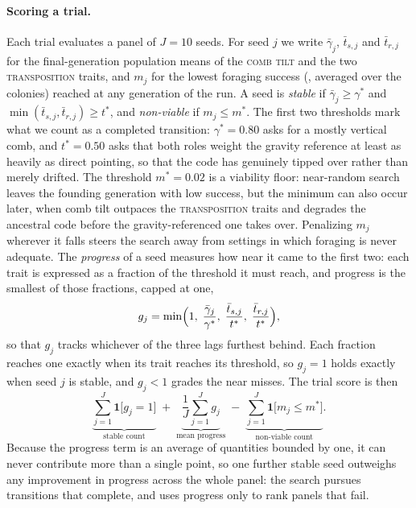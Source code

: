\documentclass[11pt]{article}
\newcommand{\trait}[1]{\textsc{#1}}
\begin{document}
\paragraph{Scoring a trial.}
Each trial evaluates a panel of $J = 10$ seeds. For seed $j$ we
write $\bar\gamma_j$, $\bar t_{s,j}$ and $\bar t_{r,j}$ for the final-generation
population means of the \trait{comb tilt} and the two \trait{transposition}
traits, and $m_j$ for the lowest foraging success (, averaged
over the colonies) reached at any generation of the run. A seed is \emph{stable} if $\bar\gamma_j \ge
\gamma^\ast$ and $\min(\bar t_{s,j}, \bar t_{r,j}) \ge t^\ast$, and
\emph{non-viable} if $m_j \le m^\ast$. The first two thresholds mark what we count
as a completed transition: $\gamma^\ast = 0.80$ asks for a mostly vertical comb,
and $t^\ast = 0.50$ asks that both roles weight the gravity reference at least as
heavily as direct pointing, so that the code has genuinely tipped over rather than
merely drifted. The threshold $m^\ast = 0.02$ is a viability floor:
near-random search leaves the founding generation with low success, but the
minimum can also occur later, when comb tilt outpaces the \trait{transposition}
traits and degrades the ancestral code before the gravity-referenced one takes
over. Penalizing $m_j$ wherever it falls steers the search away from settings in
which foraging is never adequate. The \emph{progress} of a seed measures how near it
came to the first two: each trait is expressed as a fraction of the threshold it must reach,
and progress is the smallest of those fractions, capped at one,
\begin{equation}
  g_j = \min\Bigl(1,\; \frac{\bar\gamma_j}{\gamma^\ast},\;
    \frac{\bar t_{s,j}}{t^\ast},\; \frac{\bar t_{r,j}}{t^\ast}\Bigr),
\end{equation}
so that $g_j$ tracks whichever of the three lags furthest behind. Each fraction
reaches one exactly when its trait reaches its threshold, so $g_j = 1$ holds
exactly when seed $j$ is stable, and $g_j < 1$ grades the near misses. The trial
score is then
\begin{equation}
  \underbrace{\sum_{j=1}^{J} \mathbf{1}\bigl[g_j = 1\bigr]}_{\text{stable count}}
  \;+\; \underbrace{\frac{1}{J}\sum_{j=1}^{J} g_j}_{\text{mean progress}}
  \;-\; \underbrace{\sum_{j=1}^{J} \mathbf{1}\bigl[m_j \le m^\ast\bigr]}_{\text{non-viable count}}.
\end{equation}
Because the progress term is an average of quantities bounded by
one, it can never contribute more than a single point, so one further stable seed
outweighs any improvement in progress across the whole panel: the search pursues
transitions that complete, and uses progress only to rank panels that fail.
\end{document}
